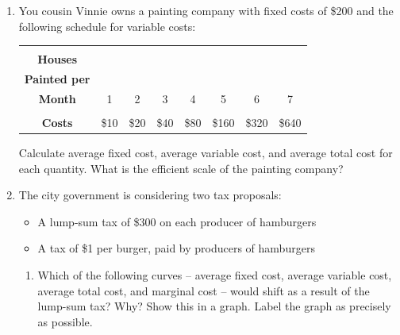 \documentclass{article}
\begin{document}
\begin{enumerate}
	\begin{enumerate}
	
	\item What is the pizzeria's fixed cost?
	
	\item Construct a table in which you calculate the marginal cost per dozen pizzas using the information on total cost. Also, calculate the marginal cost per dozen pizzas using the information on variable cost. What is the relationship between these sets of numbers? Explain.
	
	\end{enumerate}
	
\item You cousin Vinnie owns a painting company with fixed costs of \$200 and the following schedule for variable costs:

	\begin{center}
	\begin{tabular}{| c | c | c | c | c | c | c | c |}
	\hline
	\makecell{\textbf{Quantity of}\\\textbf{Houses}\\\textbf{Painted per}\\\textbf{Month}} & 1 & 2 & 3 & 4 & 5 & 6 & 7 \\
	\hline
	\makecell{\textbf{Variable}\\\textbf{Costs}} & \$10 & \$20 & \$40 & \$80 & \$160 & \$320 & \$640 \\
	\hline
	\end{tabular}
	\end{center}
	
	Calculate average fixed cost, average variable cost, and average total cost for each quantity. What is the efficient scale of the painting company? 
	
\item The city government is considering two tax proposals:

	\begin{itemize}
	
	\item A lump-sum tax of \$300 on each producer of hamburgers
	
	\item A tax of \$1 per burger, paid by producers of hamburgers
	
	\end{itemize}
	
	\begin{enumerate}
	
	\item Which of the following curves -- average fixed cost, average variable cost, average total cost, and marginal cost -- would shift as a result of the lump-sum tax? Why? Show this in a graph. Label the graph as precisely as possible.
	

\end{enumerate}
\end{enumerate}
\end{document}
